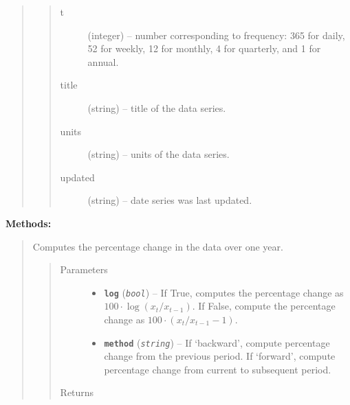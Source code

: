 \documentclass[letterpaper,10pt,english]{sphinxmanual}
\begin{document}
\begin{fulllineitems}
\begin{quote}
\begin{quote}
\begin{description}
\item[{t}] \leavevmode
(integer) -- number corresponding to frequency: 365 for daily, 52 for weekly, 12 for monthly, 4 for quarterly, and 1 for annual.

\item[{title}] \leavevmode
(string) -- title of the data series.

\item[{units}] \leavevmode
(string) -- units of the data series.

\item[{updated}] \leavevmode
(string) -- date series was last updated.

\end{description}\end{quote}
\end{quote}

\textbf{Methods:}
\begin{quote}

\begin{fulllineitems}
\label{series_class:fredpy.series.apc}
Computes the percentage change in the data over one year.
\begin{quote}\begin{description}
\item[{Parameters}] \leavevmode\begin{itemize}
\item {} 
\textbf{\texttt{log}} (\emph{\texttt{bool}}) -- If True, computes the percentage change as \(100\cdot\log(x_{t}/x_{t-1})\). If False, compute the percentage change as \(100\cdot\left( x_{t}/x_{t-1} - 1\right)\).

\item {} 
\textbf{\texttt{method}} (\emph{\texttt{string}}) -- If `backward', compute percentage change from the previous period. If `forward', compute percentage change from current to subsequent period.

\end{itemize}

\item[{Returns}] \leavevmode
{\hyperref[series_class:fredpy.series]{}}

\end{description}\end{quote}

\end{fulllineitems}


\end{quote}
\end{fulllineitems}
\end{document}
